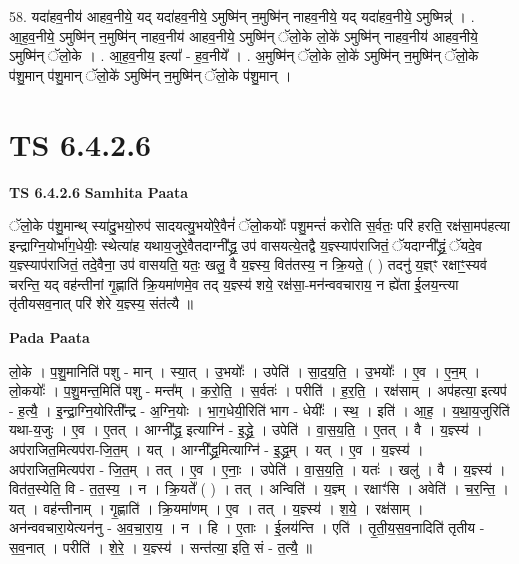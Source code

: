 \documentclass[17pt]{extarticle}
\begin{document}
58. यदा॑हव॒नीय॑ आहव॒नीये॒ यद् यदा॑हव॒नीये॒ ऽमुष्मि॑न् न॒मुष्मि॑न् नाहव॒नीये॒ यद् यदा॑हव॒नीये॒ ऽमुष्मिन्न्॑ । . आ॒ह॒व॒नीये॒ ऽमुष्मि॑न् न॒मुष्मि॑न् नाहव॒नीय॑ आहव॒नीये॒ ऽमुष्मि॑न् ॅलो॒के लो॒के॑ ऽमुष्मि॑न् नाहव॒नीय॑ आहव॒नीये॒ ऽमुष्मि॑न् ॅलो॒के । . आ॒ह॒व॒नीय॒ इत्या᳚ - ह॒व॒नीये᳚ । . अ॒मुष्मि॑न् ॅलो॒के लो॒के॑ ऽमुष्मि॑न् न॒मुष्मि॑न् ॅलो॒के प॑शु॒मान् प॑शु॒मान् ॅलो॒के॑ ऽमुष्मि॑न् न॒मुष्मि॑न् ॅलो॒के प॑शु॒मान् । \newline
\pagebreak
{}

\section{ TS 6.4.2.6 }

\textbf{TS 6.4.2.6 } \newline
\textbf{Samhita Paata} \newline

ॅलो॒के प॑शु॒मान्थ् स्या॑दु॒भयो॒रुप॑ सादयत्यु॒भयो॑रे॒वैनं॑ ॅलो॒कयोः᳚ पशु॒मन्तं॑ करोति स॒र्वतः॒ परि॑ हरति॒ रक्ष॑सा॒मप॑हत्या इन्द्राग्नि॒योर्भा॑ग॒धेयीः॒ स्थेत्या॑ह यथाय॒जुरे॒वैतदाग्नी᳚द्ध्र॒ उप॑ वासयत्ये॒तद्वै य॒ज्ञ्स्याप॑राजितं॒ ॅयदाग्नी᳚द्ध्रं॒ ॅयदे॒व य॒ज्ञ्स्याप॑राजितं॒ तदे॒वैना॒ उप॑ वासयति॒ यतः॒ खलु॒ वै य॒ज्ञ्स्य॒ वित॑तस्य॒ न क्रि॒यते॒ ( ) तदनु॑ य॒ज्ञ्ꣳ रक्षाꣳ॒॒स्यव॑ चरन्ति॒ यद् वह॑न्तीनां गृ॒ह्णाति॑ क्रि॒यमा॑णमे॒व तद् य॒ज्ञ्स्य॑ शये॒ रक्ष॑सा॒-मन॑न्ववचाराय॒ न ह्ये॑ता ई॒लय॒न्त्या तृ॑तीयसव॒नात् परि॑ शेरे य॒ज्ञ्स्य॒ संत॑त्यै ॥ \newline

\textbf{Pada Paata} \newline

लो॒के । प॒शु॒मानिति॑ पशु - मान् । स्या॒त् । उ॒भयोः᳚ । उपेति॑ । सा॒द॒य॒ति॒ । उ॒भयोः᳚ । ए॒व । ए॒न॒म् । लो॒कयोः᳚ । प॒शु॒मन्त॒मिति॑ पशु - मन्त᳚म् । क॒रो॒ति॒ । स॒र्वतः॑ । परीति॑ । ह॒र॒ति॒ । रक्ष॑साम् । अप॑हत्या॒ इत्यप॑ - ह॒त्यै॒ । इ॒न्द्रा॒ग्नि॒योरिती᳚न्द्र - अ॒ग्नि॒योः । भा॒ग॒धेयी॒रिति॑ भाग - धेयीः᳚ । स्थ॒ । इति॑ । आ॒ह॒ । य॒था॒य॒जुरिति॑ यथा-य॒जुः । ए॒व । ए॒तत् । आग्नी᳚द्ध्र॒ इत्याग्नि॑ - इ॒द्ध्रे॒ । उपेति॑ । वा॒स॒य॒ति॒ । ए॒तत् । वै । य॒ज्ञ्स्य॑ । अप॑राजित॒मित्यप॑रा-जि॒त॒म् । यत् । आग्नी᳚द्ध्र॒मित्याग्नि॑ - इ॒द्ध्र॒म् । यत् । ए॒व । य॒ज्ञ्स्य॑ । अप॑राजित॒मित्यप॑रा - जि॒त॒म् । तत् । ए॒व । ए॒नाः॒ । उपेति॑ । वा॒स॒य॒ति॒ । यतः॑ । खलु॑ । वै । य॒ज्ञ्स्य॑ । वित॑त॒स्येति॒ वि - त॒त॒स्य॒ । न । क्रि॒यते᳚ ( ) । तत् । अन्विति॑ । य॒ज्ञ्म् । रक्षाꣳ॑सि । अवेति॑ । च॒र॒न्ति॒ । यत् । वह॑न्तीनाम् । गृ॒ह्णाति॑ । क्रि॒यमा॑णम् । ए॒व । तत् । य॒ज्ञ्स्य॑ । श॒ये॒ । रक्ष॑साम् । अन॑न्ववचारा॒येत्यन॑नु - अ॒व॒चा॒रा॒य॒ । न । हि । ए॒ताः । ई॒लय॑न्ति । एति॑ । तृ॒ती॒य॒स॒व॒नादिति॑ तृतीय - स॒व॒नात् । परीति॑ । शे॒रे॒ । य॒ज्ञ्स्य॑ । सन्त॑त्या॒ इति॒ सं - त॒त्यै॒ ॥  \newline
\end{document}
